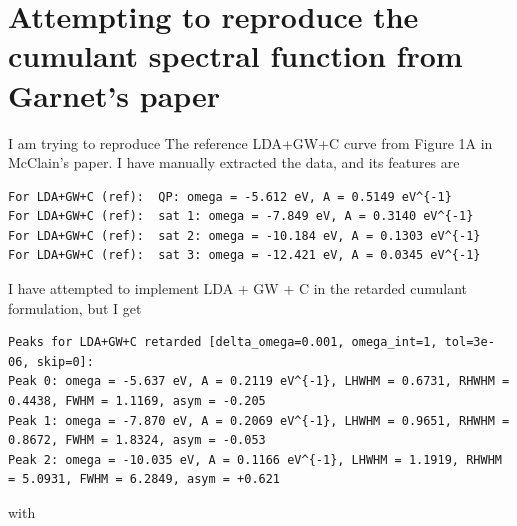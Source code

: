 \section{Attempting to reproduce the cumulant spectral function from Garnet's paper}
I am trying to reproduce The reference LDA+GW+C curve from Figure 1A in McClain's paper. I have manually extracted the data, and its features are 
\begin{verbatim}
For LDA+GW+C (ref):  QP: omega = -5.612 eV, A = 0.5149 eV^{-1}
For LDA+GW+C (ref):  sat 1: omega = -7.849 eV, A = 0.3140 eV^{-1}
For LDA+GW+C (ref):  sat 2: omega = -10.184 eV, A = 0.1303 eV^{-1}
For LDA+GW+C (ref):  sat 3: omega = -12.421 eV, A = 0.0345 eV^{-1}
\end{verbatim}
I have attempted to implement LDA + GW + C in the retarded cumulant formulation, but I get 
\begin{verbatim}
Peaks for LDA+GW+C retarded [delta_omega=0.001, omega_int=1, tol=3e-06, skip=0]:
Peak 0: omega = -5.637 eV, A = 0.2119 eV^{-1}, LHWHM = 0.6731, RHWHM = 0.4438, FWHM = 1.1169, asym = -0.205
Peak 1: omega = -7.870 eV, A = 0.2069 eV^{-1}, LHWHM = 0.9651, RHWHM = 0.8672, FWHM = 1.8324, asym = -0.053
Peak 2: omega = -10.035 eV, A = 0.1166 eV^{-1}, LHWHM = 1.1919, RHWHM = 5.0931, FWHM = 6.2849, asym = +0.621
\end{verbatim}
with
